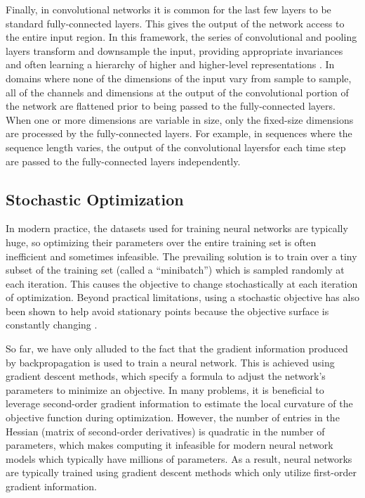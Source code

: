 Finally, in convolutional networks it is common for the last few layers to be standard fully-connected layers.
This gives the output of the network access to the entire input region.
In this framework, the series of convolutional and pooling layers transform and downsample the input, providing appropriate invariances and often learning a hierarchy of higher and higher-level representations \cite{zeiler2014visualizing}.
In domains where none of the dimensions of the input vary from sample to sample, all of the channels and dimensions at the output of the convolutional portion of the network are flattened prior to being passed to the fully-connected layers.
When one or more dimensions are variable in size, only the fixed-size dimensions are processed by the fully-connected layers.
For example, in sequences where the sequence length varies, the output of the convolutional layersfor each time step are passed to the fully-connected layers independently.

\subsection{Stochastic Optimization}

In modern practice, the datasets used for training neural networks are typically huge, so optimizing their parameters over the entire training set is often inefficient and sometimes infeasible.
The prevailing solution is to train over a tiny subset of the training set (called a ``minibatch'') which is sampled randomly at each iteration.
This causes the objective to change stochastically at each iteration of optimization.
Beyond practical limitations, using a stochastic objective has also been shown to help avoid stationary points because the objective surface is constantly changing \cite{lecun2012efficient}.

So far, we have only alluded to the fact that the gradient information produced by backpropagation is used to train a neural network.
This is achieved using gradient descent methods, which specify a formula to adjust the network's parameters to minimize an objective.
In many problems, it is beneficial to leverage second-order gradient information to estimate the local curvature of the objective function during optimization.
However, the number of entries in the Hessian (matrix of second-order derivatives) is quadratic in the number of parameters, which makes computing it infeasible for modern neural network models which typically have millions of parameters.
As a result, neural networks are typically trained using gradient descent methods which only utilize first-order gradient information.

